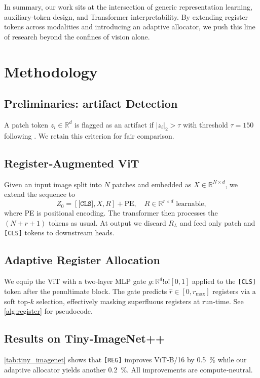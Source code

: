 \documentclass{article}
\newcommand{\RegTok}{\texttt{[REG]}\xspace}
\newcommand{\nreg}{r}
\newcommand{\citet}{\textcite}
\begin{document}
\smallskip
In summary, our work sits at the intersection of generic representation learning, auxiliary‑token design, and Transformer interpretability.  By extending register tokens across modalities and introducing an adaptive allocator, we push this line of research beyond the confines of vision alone.

\section{Methodology}
\label{sec:method}
\subsection{Preliminaries: artifact Detection}
A patch token $z_i\in\mathbb R^d$ is flagged as an artifact if $|z_i|_2 > \tau$ with threshold $\tau=150$ following \citet{darcetVisionTransformersNeed2024}.  We retain this criterion for fair comparison.

\subsection{Register‑Augmented ViT}
Given an input image split into $N$ patches and embedded as $X\in\mathbb R^{N\times d}$, we extend the sequence to
\begin{equation}
Z_0 = [\texttt{[CLS]}, X, R] + \text{PE}, \quad R\in\mathbb R^{\nreg\times d}\text{ learnable},
\end{equation}
where PE is positional encoding.  The transformer then processes the $(N{+}\nreg{+}1)$ tokens as usual.  At output we discard $R_L$ and feed only patch and \texttt{[CLS]} tokens to downstream heads.

\subsection{Adaptive Register Allocation}
We equip the ViT with a two‑layer MLP gate $g:\mathbb R^{d}!	o![0,1]$ applied to the \texttt{[CLS]} token after the penultimate block.  The gate predicts $\hat{\nreg}\in [0,\nreg_{\max}]$ registers via a soft top‑$k$ selection, effectively masking superfluous registers at run‑time.  See \cref{alg:register} for pseudocode.

\subsection{Results on Tiny‑ImageNet++}
\cref{tab:tiny_imagenet} shows that \RegTok improves ViT‑B/16 by \SI{0.5}{\percent} while our adaptive allocator yields another \SI{0.2}{\percent}.  All improvements are compute‑neutral.
\end{document}
